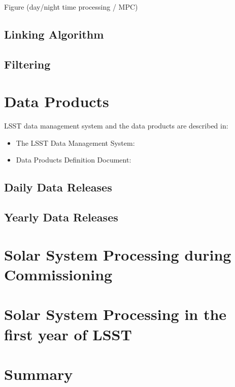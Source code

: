 Figure (day/night time processing / MPC)

\subsection{Linking Algorithm}
\vspace{0.4cm}
\subsection{Filtering}
\vspace{0.4cm}

\section{Data Products}
LSST data management system and the data products are described in:

\begin{itemize}
  \item The LSST Data Management System: \cite{2015arXiv151207914J}
  \item Data Products Definition Document: \cite{LSE-163}
\end{itemize}

\subsection{Daily Data Releases}
\vspace{0.4cm}
\subsection{Yearly Data Releases}
\vspace{0.4cm}
\section{Solar System Processing during Commissioning}
\vspace{0.4cm}
\section{Solar System Processing in the first year of LSST}
\vspace{0.4cm}
\section{Summary}
